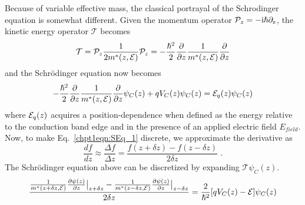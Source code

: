 \documentclass[12pt]{report}
\begin{document}
Because of variable effective mass, the classical portrayal of the Schrodinger equation is somewhat different.  Given the momentum operator $\mathcal{P}_z = -\rm{i} \hslash \partial_z$, the kinetic energy operator $\mathcal{T}$ becomes \cite{Sirtori:PRB:1994}
\begin{equation}
\mathcal{T} = \mathcal{P}_z \frac{1}{2 m^*(z,\EE)} \mathcal{P}_z =
-\frac{\hslash^2}{2} \frac{\partial}{\partial z} \frac{1}{m^*(z,\EE)} \frac{\partial}{\partial z}
\end{equation}
and the Schr\"{o}dinger equation now becomes
\begin{equation}
\label{chpt1eqn:SEq_1}
-\frac{\hslash^2}{2} \frac{\partial}{\partial z} \frac{1}{m^*(z,\EE)} \frac{\partial}{\partial z} \psi_C(z) + q V_C(z) \psi_C(z) = \EE_q(z) \psi_C(z)
\end{equation}
where $\EE_q(z)$ acquires a position-dependence when defined as the energy relative to the conduction band edge and in the presence of an applied electric field $E_{field}$.  Now, to make Eq.~\eqref{chpt1eqn:SEq_1} discrete, we approximate the derivative as
\begin{equation}
\label{chpt1eqn:discrete_derivative}
\frac{d {f}}{dz} \approx \frac{\Delta {f}}{\Delta z} = \frac{{f}(z+\delta z) -{f}(z-\delta z)}{2 \delta z} \text{~.}
\end{equation}
The Schr\"{o}dinger equation above can be discretized by expanding $\mathcal{T} \psi_C(z)$.
\begin{equation}
\frac{\frac{1}{m^{*}(z+\delta z,\EE)} \frac{\partial \psi(z)}{\partial z} \big |_{z+\delta z} - \frac{1}{m^{*}(z-\delta z,\EE)} \frac{\partial \psi(z)}{\partial z} \big |_{z-\delta z}}{2 \delta z} = \frac{2}{\hslash^2}[q V_C(z)-\EE]\psi_C(z)
\end{equation}
\end{document}
